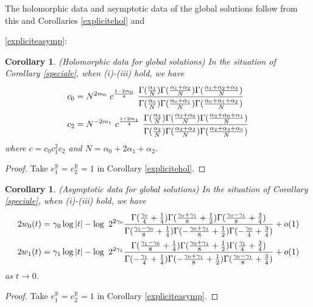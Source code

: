 \documentclass[a4paper,12pt,leqno]{amsart}
\numberwithin{equation}{section}
\theoremstyle{plain}
\newtheorem{corollary}[theorem]{Corollary}
\theoremstyle{definition}
\newcommand{\R}{\mathbb R}
\newcommand{\al}{\alpha}
\newcommand{\ga}{\gamma}
\newcommand{\Ga}{\Gamma}
\newcommand{\nn}{m}
\newcommand{\pga}{\vphantom{{A_A}_A}\ga}  %
\newcommand{\pal}{\vphantom{{A_A}_A}\al}  %
\begin{document}
The holomorphic data and asymptotic data of the global solutions follow from this and Corollaries \ref{explicitehol} and {\ref{expliciteasymp}:

\begin{corollary}\label{holomorphicdata} 
{\em(Holomorphic data for global solutions)}
In the situation of Corollary \ref{speciale}, when (i)-(iii) hold, we have
\begin{align*}
c_0&=N^{2\nn_0} \ c^{\frac{1-2\nn_0}{4}}\ 
\frac
{
\Ga(  \frac{\pal_1}{N})
\Ga(  \frac{\pal_1+\pal_2}{N})
\Ga(  \frac{\pal_1+\pal_2+\pal_3}{N})
}
{
\Ga(  \frac{\pal_0}{N}  )
\Ga(  \frac{\pal_0+\pal_1}{N})
\Ga(  \frac{\pal_0+\pal_1+\pal_2}{N})
}
\\
c_2&=N^{-2\nn_1} \ c^{\frac{1+2\nn_1}{4}}\ 
\frac
{
\Ga(  \frac{\pal_3}{N}  )
\Ga(  \frac{\pal_3+\pal_0}{N})
\Ga(  \frac{\pal_3+\pal_0+\pal_1}{N})
}
{
\Ga(  \frac{\pal_2}{N})
\Ga(  \frac{\pal_2+\pal_3}{N})
\Ga(  \frac{\pal_2+\pal_3+\pal_0}{N})
}
\end{align*}
where $c=c_0c_1^2c_2$ and  $N=\al_0\!+\!2\al_1\!+\!\al_2$.
\end{corollary}

\begin{proof}
Take $e_1^\R=e_2^\R=1$ in Corollary \ref{explicitehol}.
\end{proof}

\begin{corollary}\label{tracywidom} 
{\em(Asymptotic data for global solutions)}
In the situation of Corollary \ref{speciale}, when (i)-(iii) hold, we have
\begin{align*}
2w_0(t)  &=  \ga_0\log\vert t\vert - \log\ 2^{2\ga_0}
\frac
{
\Ga(  \frac{\pga_0}{4}+\frac14  )
\Ga(  \frac{\pga_0+\pga_1}{8}+\frac12 )
\Ga(  \frac{\pga_0-\pga_1}{8}+\frac34  )
}
{
\Ga(  \frac{\pga_1-\pga_0}{8}+\frac14  )
\Ga(  -\frac{\pga_0+\pga_1}{8}+\frac12  )
\Ga(  -\frac{\pga_0}{4}+\frac34  )
}
+o(1)
\\
2w_1(t)  &=  \ga_1\log\vert t\vert - \log\ 2^{2\ga_1}
\frac
{
\Ga(  \frac{\pga_1-\pga_0}{8}+\frac14  )
\Ga(  \frac{\pga_0+\pga_1}{8}+\frac12 )
\Ga(  \frac{\pga_1}{4}+\frac34  )
}
{
\Ga(  -\frac{\pga_1}{4}+\frac14  )
\Ga(  -\frac{\pga_0+\pga_1}{8}+\frac12  )
\Ga(  \frac{\pga_0-\pga_1}{8}+\frac34  )
}
+o(1)
\end{align*}
as $t\to 0$.
\end{corollary}

\begin{proof}
Take $e_1^\R=e_2^\R=1$ in Corollary \ref{expliciteasymp}.
\end{proof}

}
\end{document}

